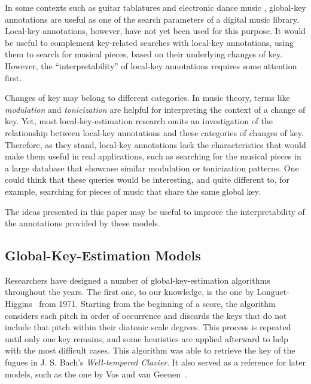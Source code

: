 \documentclass[sigconf]{acmart}
\begin{document}
In some contexts such as guitar tablatures \cite{ultimateguitar} and electronic dance music \cite{beatport}, global-key annotations are useful as one of the search parameters of a digital music library. 
Local-key annotations, however, have not yet been used for this purpose. 
It would be useful to complement key-related searches with local-key annotations, using them to search for musical pieces, based on their underlying changes of key. 
However, the ``interpretability'' of local-key annotations requires some attention first. 

Changes of key may belong to different categories. 
In music theory, terms like \emph{modulation} and \emph{tonicization} are helpful for interpreting the context of a change of key. 
Yet, most local-key-estimation research omits an investigation of the relationship between local-key annotations and these categories of changes of key. 
Therefore, as they stand, local-key annotations lack the characteristics that would make them useful in real applications, such as searching for the musical pieces in a large database that showcase similar modulation or tonicization patterns. 
One could think that these queries would be interesting, and quite different to, for example, searching for pieces of music that share the same global key. 

The ideas presented in this paper may be useful to improve the interpretability of the annotations provided by these models.



\subsection{Global-Key-Estimation Models}
Researchers have designed a number of global-key-estimation algorithms throughout the years. 
The first one, to our knowledge, is the one by Longuet-Higgins~\cite{longuet1971tonality} from 1971.
Starting from the beginning of a score, the algorithm considers each pitch in order of occurrence and discards the keys that do not include that pitch within their diatonic scale degrees. 
This process is repeated until only one key remains, and some heuristics are applied afterward to help with the most difficult cases. This algorithm was able to retrieve the key of the fugues in J. S. Bach's \emph{Well-tempered Clavier}. 
It also served as a reference for later models, such as the one by Vos and van Geenen~\cite{vos96keyfinding}.
\end{document}
